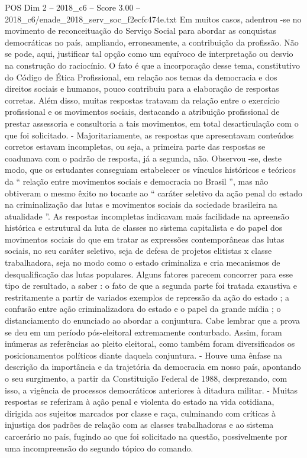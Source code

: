 \begin{textsample}{POS Dim 2 – 2018\_c6 – Score 3.00 – 2018\_c6/enade\_2018\_serv\_soc\_f2ecfc474e.txt}
Em muitos casos, adentrou -se no movimento de reconceituação do Serviço Social para abordar as conquistas democráticas no país, ampliando, erroneamente, a contribuição da profissão.
Não se pode, aqui, justificar tal opção como um equívoco de interpretação ou desvio na construção do raciocínio.
O fato é que a incorporação desse tema, constitutivo do Código de Ética Profissional, em relação aos temas da democracia e dos direitos sociais e humanos, pouco contribuiu para a elaboração de respostas corretas.
Além disso, muitas respostas tratavam da relação entre o exercício profissional e os movimentos sociais, destacando a atribuição profissional de prestar assessoria e consultoria a tais movimentos, em total desarticulação com o que foi solicitado. - Majoritariamente, as respostas que apresentavam conteúdos corretos estavam incompletas, ou seja, a primeira parte das respostas se coadunava com o padrão de resposta, já a segunda, não.
Observou -se, deste modo, que os estudantes conseguiam estabelecer os vínculos históricos e teóricos da “ relação entre movimentos sociais e democracia no Brasil ”, mas não obtiveram o mesmo êxito no tocante ao “ caráter seletivo da ação penal do estado na criminalização das lutas e movimentos sociais da sociedade brasileira na atualidade ”.
As respostas incompletas indicavam mais facilidade na apreensão histórica e estrutural da luta de classes no sistema capitalista e do papel dos movimentos sociais do que em tratar as expressões contemporâneas das lutas sociais, no seu caráter seletivo, seja de defesa de projetos elitistas x classe trabalhadora, seja no modo como o estado criminaliza e cria mecanismos de desqualificação das lutas populares.
Alguns fatores parecem concorrer para esse tipo de resultado, a saber : o fato de que a segunda parte foi tratada exaustiva e restritamente a partir de variados exemplos de repressão da ação do estado ; a confusão entre ação criminalizadora do estado e o papel da grande mídia ; o distanciamento do enunciado ao abordar a conjuntura.
Cabe lembrar que a prova se deu em um período pós-eleitoral extremamente conturbado.
Assim, foram inúmeras as referências ao pleito eleitoral, como também foram diversificados os posicionamentos políticos diante daquela conjuntura. - Houve uma ênfase na descrição da importância e da trajetória da democracia em nosso país, apontando o seu surgimento, a partir da Constituição Federal de 1988, desprezando, com isso, a vigência de processos democráticos anteriores à ditadura militar. - Muitas respostas se referiram à ação penal e violenta do estado na vida cotidiana, dirigida aos sujeitos marcados por classe e raça, culminando com críticas à injustiça dos padrões de relação com as classes trabalhadoras e ao sistema carcerário no país, fugindo ao que foi solicitado na questão, possivelmente por uma incompreensão do segundo tópico do comando.

\end{textsample}
